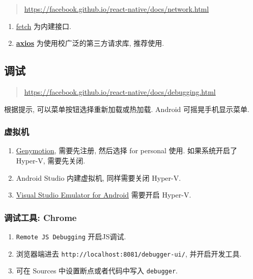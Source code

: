 \begin{quote}
\url{https://facebook.github.io/react-native/docs/network.html}
\end{quote}

\begin{enumerate}
\def\labelenumi{\arabic{enumi}.}
\tightlist
\item
  \href{https://developer.mozilla.org/en-US/docs/Web/API/Fetch_API}{fetch}
  为内建接口.
\item
  \href{https://github.com/axios/axios}{\textbf{axios}}
  为使用校广泛的第三方请求库, 推荐使用.
\end{enumerate}

\subsection{调试}\label{ux8c03ux8bd5}

\begin{quote}
\url{https://facebook.github.io/react-native/docs/debugging.html}
\end{quote}

根据提示, 可以菜单按钮选择重新加载或热加载. Android 可摇晃手机显示菜单.

\subsubsection{虚拟机}\label{ux865aux62dfux673a}

\begin{enumerate}
\def\labelenumi{\arabic{enumi}.}
\tightlist
\item
  \href{https://www.genymotion.com/download/}{Genymotion}, 需要先注册,
  然后选择 for personal 使用. 如果系统开启了 Hyper-V, 需要先关闭.
\item
  Android Studio 内建虚拟机, 同样需要关闭 Hyper-V.
\item
  \href{https://www.visualstudio.com/vs/msft-android-emulator/}{Visual
  Studio Emulator for Android} 需要开启 Hyper-V.
\end{enumerate}

\subsubsection{调试工具: Chrome}\label{ux8c03ux8bd5ux5de5ux5177-chrome}

\begin{enumerate}
\def\labelenumi{\arabic{enumi}.}
\tightlist
\item
  \lstinline!Remote JS Debugging! 开启JS调试.
\item
  浏览器端进去 \lstinline!http://localhost:8081/debugger-ui/!,
  并开启开发工具.
\item
  可在 Sources 中设置断点或者代码中写入 \lstinline!debugger!.
\end{enumerate}


